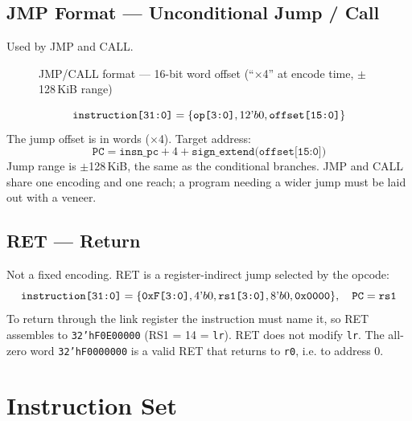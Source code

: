 \documentclass[11pt,a4paper]{article}
\begin{document}
\subsection{JMP Format --- Unconditional Jump / Call}
Used by JMP and CALL.

\begin{figure}[H]
\centering
{}
\caption{JMP/CALL format --- 16-bit word offset (``$\times$4'' at encode time, $\pm$128\,KiB range)}
\end{figure}

\[
\texttt{instruction[31:0]} = \{ \texttt{op[3:0]}, 12\textrm{\textquoteright}b0, \texttt{offset[15:0]} \}
\]
The jump offset is in words ($\times$4). Target address:
\[
\texttt{PC} = \texttt{insn\_pc} + 4 + \texttt{sign\_extend(offset[15:0])}
\]
Jump range is $\pm$128\,KiB, the same as the conditional branches. JMP and
CALL share one encoding and one reach; a program needing a wider jump must be
laid out with a veneer.

\subsection{RET --- Return}
Not a fixed encoding. RET is a register-indirect jump selected by the opcode:
\[
\texttt{instruction[31:0]} = \{ \texttt{0xF[3:0]}, 4\textrm{\textquoteright}b0, \texttt{rs1[3:0]}, 8\textrm{\textquoteright}b0, \texttt{0x0000} \},
\quad \texttt{PC} = \texttt{rs1}
\]
To return through the link register the instruction must name it, so RET
assembles to {\tt 32'hF0E00000} (RS1 = 14 = {\tt lr}). RET does not modify
{\tt lr}. The all-zero word {\tt 32'hF0000000} is a valid RET that returns to
{\tt r0}, i.e. to address 0.

\newpage

\section{Instruction Set}
\end{document}
